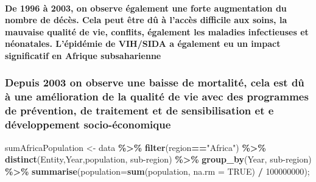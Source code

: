 \documentclass[
]{article}
\newenvironment{Shaded}{\begin{snugshade}}{\end{snugshade}}
\newcommand{\AttributeTok}[1]{\textcolor[rgb]{0.13,0.29,0.53}{#1}}
\newcommand{\ConstantTok}[1]{\textcolor[rgb]{0.56,0.35,0.01}{#1}}
\newcommand{\DecValTok}[1]{\textcolor[rgb]{0.00,0.00,0.81}{#1}}
\newcommand{\FunctionTok}[1]{\textcolor[rgb]{0.13,0.29,0.53}{\textbf{#1}}}
\newcommand{\NormalTok}[1]{#1}
\newcommand{\OtherTok}[1]{\textcolor[rgb]{0.56,0.35,0.01}{#1}}
\newcommand{\SpecialCharTok}[1]{\textcolor[rgb]{0.81,0.36,0.00}{\textbf{#1}}}
\newcommand{\StringTok}[1]{\textcolor[rgb]{0.31,0.60,0.02}{#1}}
\begin{document}
\hypertarget{de-1996-uxe0-2003-on-observe-uxe9galement-une-forte-augmentation-du-nombre-de-duxe9cuxe8s.-cela-peut-uxeatre-duxfb-uxe0-laccuxe8s-difficile-aux-soins-la-mauvaise-qualituxe9-de-vie-conflits-uxe9galement-les-maladies-infectieuses-et-nuxe9onatales.-luxe9piduxe9mie-de-vihsida-a-uxe9galement-eu-un-impact-significatif-en-afrique-subsaharienne}{%
\paragraph{De 1996 à 2003, on observe également une forte augmentation
du nombre de décès. Cela peut être dû à l'accès difficile aux soins, la
mauvaise qualité de vie, conflits, également les maladies infectieuses
et néonatales. L'épidémie de VIH/SIDA a également eu un impact
significatif en Afrique
subsaharienne}\label{de-1996-uxe0-2003-on-observe-uxe9galement-une-forte-augmentation-du-nombre-de-duxe9cuxe8s.-cela-peut-uxeatre-duxfb-uxe0-laccuxe8s-difficile-aux-soins-la-mauvaise-qualituxe9-de-vie-conflits-uxe9galement-les-maladies-infectieuses-et-nuxe9onatales.-luxe9piduxe9mie-de-vihsida-a-uxe9galement-eu-un-impact-significatif-en-afrique-subsaharienne}}

\hypertarget{depuis-2003-on-observe-une-baisse-de-mortalituxe9-cela-est-duxfb-uxe0-une-amuxe9lioration-de-la-qualituxe9-de-vie-avec-des-programmes-de-pruxe9vention-de-traitement-et-de-sensibilisation-et-e-duxe9veloppement-socio-uxe9conomique}{%
\subsubsection{Depuis 2003 on observe une baisse de mortalité, cela est
dû à une amélioration de la qualité de vie avec des programmes de
prévention, de traitement et de sensibilisation et e développement
socio-économique}\label{depuis-2003-on-observe-une-baisse-de-mortalituxe9-cela-est-duxfb-uxe0-une-amuxe9lioration-de-la-qualituxe9-de-vie-avec-des-programmes-de-pruxe9vention-de-traitement-et-de-sensibilisation-et-e-duxe9veloppement-socio-uxe9conomique}}

\begin{Shaded}
\begin{Highlighting}[]
\NormalTok{sumAfricaPopulation }\OtherTok{\textless{}{-}}\NormalTok{ data }\SpecialCharTok{\%\textgreater{}\%} 
  \FunctionTok{filter}\NormalTok{(region}\SpecialCharTok{==}\StringTok{"Africa"}\NormalTok{) }\SpecialCharTok{\%\textgreater{}\%}
  \FunctionTok{distinct}\NormalTok{(Entity,Year,population, }\StringTok{\textasciigrave{}}\AttributeTok{sub{-}region}\StringTok{\textasciigrave{}}\NormalTok{) }\SpecialCharTok{\%\textgreater{}\%}
  \FunctionTok{group\_by}\NormalTok{(Year, }\StringTok{\textasciigrave{}}\AttributeTok{sub{-}region}\StringTok{\textasciigrave{}}\NormalTok{) }\SpecialCharTok{\%\textgreater{}\%}
  \FunctionTok{summarise}\NormalTok{(}\AttributeTok{population=}\FunctionTok{sum}\NormalTok{(population, }\AttributeTok{na.rm =} \ConstantTok{TRUE}\NormalTok{) }\SpecialCharTok{/} \DecValTok{100000000}\NormalTok{);}
\end{Highlighting}
\end{Shaded}
\end{document}
